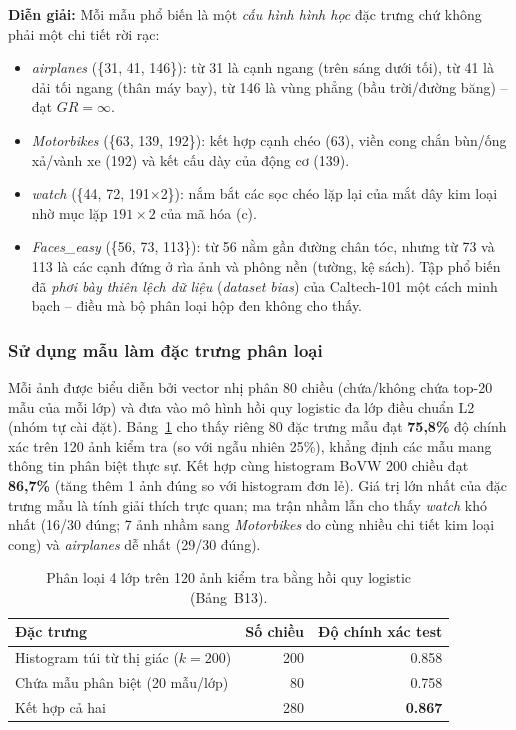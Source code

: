 \textbf{Diễn giải:} Mỗi mẫu phổ biến là một \emph{cấu hình hình học} đặc trưng chứ không phải một chi tiết rời rạc:
\begin{itemize}
    \item \emph{airplanes} (\{31, 41, 146\}): từ 31 là cạnh ngang (trên sáng dưới tối), từ 41 là dải tối ngang (thân máy bay), từ 146 là vùng phẳng (bầu trời/đường băng) -- đạt $GR = \infty$.
    \item \emph{Motorbikes} (\{63, 139, 192\}): kết hợp cạnh chéo (63), viền cong chắn bùn/ống xả/vành xe (192) và kết cấu dày của động cơ (139).
    \item \emph{watch} (\{44, 72, 191$\times$2\}): nắm bắt các sọc chéo lặp lại của mắt dây kim loại nhờ mục lặp $191{\times}2$ của mã hóa (c).
    \item \emph{Faces\_easy} (\{56, 73, 113\}): từ 56 nằm gần đường chân tóc, nhưng từ 73 và 113 là các cạnh đứng ở rìa ảnh và phông nền (tường, kệ sách). Tập phổ biến đã \emph{phơi bày thiên lệch dữ liệu} (\emph{dataset bias}) của Caltech-101 một cách minh bạch -- điều mà bộ phân loại hộp đen không cho thấy.
\end{itemize}

\subsubsection{Sử dụng mẫu làm đặc trưng phân loại}
Mỗi ảnh được biểu diễn bởi vector nhị phân 80 chiều (chứa/không chứa top-20 mẫu của mỗi lớp) và đưa vào mô hình hồi quy logistic đa lớp điều chuẩn L2 (nhóm tự cài đặt). Bảng~\ref{tab:b13_bovw_classification} cho thấy riêng 80 đặc trưng mẫu đạt \textbf{75,8\%} độ chính xác trên 120 ảnh kiểm tra (so với ngẫu nhiên 25\%), khẳng định các mẫu mang thông tin phân biệt thực sự. Kết hợp cùng histogram BoVW 200 chiều đạt \textbf{86,7\%} (tăng thêm 1 ảnh đúng so với histogram đơn lẻ). Giá trị lớn nhất của đặc trưng mẫu là tính giải thích trực quan; ma trận nhầm lẫn cho thấy \emph{watch} khó nhất (16/30 đúng; 7 ảnh nhầm sang \emph{Motorbikes} do cùng nhiều chi tiết kim loại cong) và \emph{airplanes} dễ nhất (29/30 đúng).

\begin{table}[!t]
\centering
\caption{Phân loại 4 lớp trên 120 ảnh kiểm tra bằng hồi quy logistic (Bảng~B13).}
\label{tab:b13_bovw_classification}
\scriptsize
\begin{tabular}{@{}lrr@{}}
\toprule
Đặc trưng & Số chiều & Độ chính xác test \\
\midrule
Histogram túi từ thị giác ($k = 200$) & 200 & 0.858 \\
Chứa mẫu phân biệt (20 mẫu/lớp) & 80 & 0.758 \\
Kết hợp cả hai & 280 & \textbf{0.867} \\
\bottomrule
\end{tabular}
\end{table}

